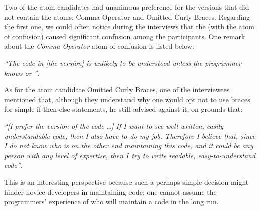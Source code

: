 Two of the atom candidates had unanimous preference for the
versions that did not contain the atoms: Comma Operator and
Omitted Curly Braces. Regarding the first one, we could
often notice during the interviews that
the \emph{\lhs} (with the atom of confusion) 
caused significant
confusion among the participants. One remark about
the \emph{Comma Operator} atom of confusion is listed below:


\begin{mq}
\emph{``The code in 
[the \lhs version]
is unlikely to be understood unless the programmer knows \clang or \cpplang''}.
\end{mq}

As for the atom candidate Omitted Curly Braces, one of the interviewees mentioned that, although they understand why one would opt not to use braces for simple if-then-else statements, he still advised against it, on grounds that:

\begin{mq}
\emph{``[I prefer the \rhs version of the code \ldots]
If I want to see well-written, easily understandable code, then I also have to do my job. Therefore I believe that, since I do not know who is on the other end maintaining this code, and it could be any person with any level of expertise, then I try to write readable, easy-to-understand code''}.
\end{mq}


This is an interesting perspective because such a perhaps simple decision might hinder novice developers in maintaining code; one cannot assume the programmers' experience of who will maintain a code in the long run.

